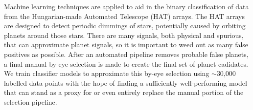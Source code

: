 Machine learning techniques are applied to aid in the binary classification of data from the Hungarian-made Automated Telescope (HAT) arrays.  The HAT arrays are designed to detect periodic dimmings of stars, potentially caused by orbiting planets around those stars.  There are many signals, both physical and spurious, that can approximate planet signals, so it is important to weed out as many false positives as possible.  After an automated pipeline removes probable false planets, a final manual by-eye selection is made to create the final set of planet cadidates.  We train classifier models to approximate this by-eye selection using ${\sim}$30,000 labelled data points with the hope of finding a sufficiently well-performing model that can stand as a proxy for or even entirely replace the manual portion of the selection pipeline.